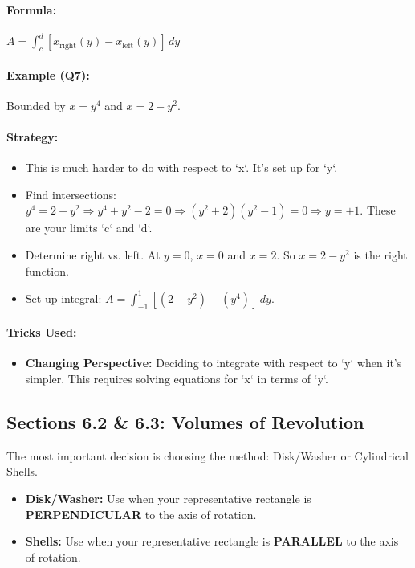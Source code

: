\documentclass{article}
\begin{document}
\paragraph{Formula:} $ A = \int_c^d [x_{\text{right}}(y) - x_{\text{left}}(y)] \,dy $
\paragraph{Example (Q7):} Bounded by $x=y^4$ and $x=2-y^2$.
\paragraph{Strategy:}
\begin{itemize}
    \item This is much harder to do with respect to `x`. It's set up for `y`.
    \item Find intersections: $y^4 = 2-y^2 \Rightarrow y^4+y^2-2=0 \Rightarrow (y^2+2)(y^2-1)=0 \Rightarrow y=\pm 1$. These are your limits `c` and `d`.
    \item Determine right vs. left. At $y=0$, $x=0$ and $x=2$. So $x=2-y^2$ is the right function.
    \item Set up integral: $A = \int_{-1}^1 [(2-y^2) - (y^4)] \,dy$.
\end{itemize}
\paragraph{Tricks Used:}
\begin{itemize}
    \item \textbf{Changing Perspective:} Deciding to integrate with respect to `y` when it's simpler. This requires solving equations for `x` in terms of `y`.
\end{itemize}

\subsection{Sections 6.2 \& 6.3: Volumes of Revolution}
The most important decision is choosing the method: Disk/Washer or Cylindrical Shells.
\begin{itemize}
    \item \textbf{Disk/Washer:} Use when your representative rectangle is \textbf{PERPENDICULAR} to the axis of rotation.
    \item \textbf{Shells:} Use when your representative rectangle is \textbf{PARALLEL} to the axis of rotation.
\end{itemize}
\end{document}
